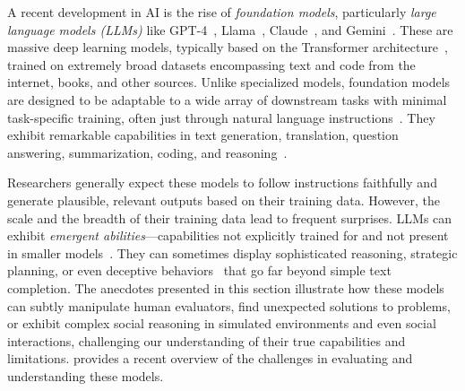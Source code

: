 \documentclass[10pt]{article}
\def\citep#1{}%
\def\citet#1{}%
\begin{document}
A recent development in AI is the rise of \textit{foundation models}, particularly \textit{large language models (LLMs)} like GPT-4~\citep{openai2024gpt4}, Llama~\citep{grattafiori2024llama3herdmodels}, Claude~\citep{claude3family}, and Gemini~\citep{comanici2025gemini}. 
These are massive deep learning models, typically based on the Transformer architecture~\citep{vaswani2023attentionneed}, trained on extremely broad datasets encompassing text and code from the internet, books, and other sources. Unlike specialized models, foundation models are designed to be adaptable to a wide array of downstream tasks with minimal task-specific training, often just through natural language instructions~\citep{brown2020languagemodelsfewshotlearners}. 
They exhibit remarkable capabilities in text generation, translation, question answering, summarization, coding, and reasoning~\citep{bubeck2023sparksartificialgeneralintelligence}.

Researchers generally expect these models to follow instructions faithfully and generate plausible, relevant outputs based on their training data. However, the scale and the breadth of their training data lead to frequent surprises. LLMs can exhibit \textit{emergent abilities}---capabilities not explicitly trained for and not present in smaller models~\citep{wei2022emergentabilitieslargelanguage}.
They can sometimes display sophisticated reasoning, strategic planning, or even deceptive behaviors~\citep{park2023generative} that go far beyond simple text completion. 
The anecdotes presented in this section illustrate how these models can subtly manipulate human evaluators, find unexpected solutions to problems, or exhibit complex social reasoning in simulated environments and even social interactions, challenging our understanding of their true capabilities and limitations.
\citet{bowman2023thingsknowlargelanguage} provides a recent overview of the challenges in evaluating and understanding these models.
\end{document}
